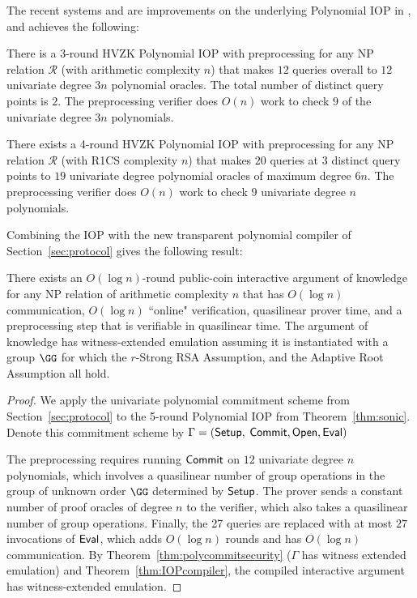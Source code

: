 The recent systems  and \cite{Marlin} are improvements on the underlying Polynomial IOP in , and achieves the following: 

\begin{theorem} 
There is a 3-round HVZK Polynomial IOP with preprocessing for any NP relation $\mathcal{R}$ (with arithmetic complexity $n$) that makes $12$ queries overall to $12$ univariate degree $3n$ polynomial oracles. The total number of distinct query points is $2$. The preprocessing verifier does $O(n)$ work to check $9$ of the univariate degree $3n$ polynomials.
\end{theorem}
\begin{theorem} 
There exists a 4-round HVZK Polynomial IOP with preprocessing for any NP relation $\mathcal{R}$ (with R1CS complexity $n$) that makes $20$ queries at $3$ distinct query points to $19$ univariate degree polynomial oracles of maximum degree  $6n$. The preprocessing verifier does $O(n)$ work to check $9$ univariate degree $n$ polynomials.
\end{theorem}

Combining the  IOP with the new transparent polynomial compiler of Section~\ref{sec:protocol} gives the following result:  

\begin{theorem}
There exists an $O(\log n)$-round public-coin interactive argument of knowledge for any NP relation of arithmetic complexity $n$ that has $O(\log n)$ communication, $O(\log n)$ ``online" verification, quasilinear prover time, and a preprocessing step that is verifiable in quasilinear time. The argument of knowledge has witness-extended emulation assuming it is instantiated with a group $\GG$ for which the $r$-Strong RSA Assumption, and the Adaptive Root Assumption all hold. 
\end{theorem}
\begin{proof}
We apply the univariate polynomial commitment scheme from Section~\ref{sec:protocol} to the 5-round Polynomial IOP from Theorem~\ref{thm:sonic}. Denote this commitment scheme by $\Gamma = (\textsf{{Setup}},$ $\textsf{{Commit}}, \textsf{{Open}}, \textsf{{Eval}})$ 

The preprocessing requires running $\textsf{{Commit}}$ on $12$ univariate degree $n$ polynomials, which involves a quasilinear number of group operations in the group of unknown order $\GG$ determined by $\textsf{{Setup}}$. The prover sends a constant number of proof oracles of degree $n$ to the verifier, which also takes a quasilinear number of group operations. Finally, the 27 queries are replaced with at most $27$ invocations of $\textsf{{Eval}}$, which adds $O(\log n )$ rounds and has $O(\log n)$ communication. By Theorem~\ref{thm:polycommitsecurity} ($\Gamma$ has witness extended emulation) and Theorem~\ref{thm:IOPcompiler}, the compiled interactive argument has witness-extended emulation.
\end{proof}





